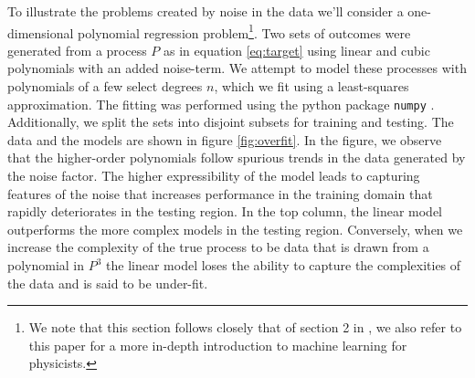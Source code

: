 To illustrate the problems created by noise in the data we'll consider a one-dimensional polynomial regression problem\footnote{We note that this section follows closely that of section 2 in \citet{Mehta2019}, we also refer to this paper for a more in-depth introduction to machine learning for physicists.}. Two sets of outcomes were generated from a process $P$ as in equation \ref{eq:target} using linear and cubic polynomials with an added noise-term. We attempt to model these processes with polynomials of a few select degrees $n$, which we fit using a least-squares approximation. The fitting was performed using the python package \lstinline{numpy} \cite{numpy}. Additionally, we split the sets into disjoint subsets for training and testing. The data and the models are shown in figure \ref{fig:overfit}. In the figure, we observe that the higher-order polynomials follow spurious trends in the data generated by the noise factor. The higher expressibility of the model leads to capturing features of the noise that increases performance in the training domain that rapidly deteriorates in the testing region. In the top column, the linear model outperforms the more complex models in the testing region. Conversely, when we increase the complexity of the true process to be data that is drawn from a polynomial in $P^3$ the linear model loses the ability to capture the complexities of the data and is said to be under-fit.  


